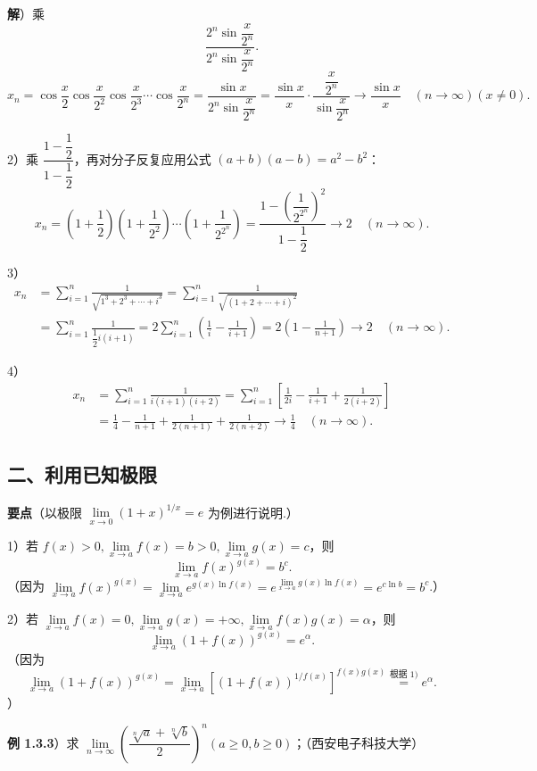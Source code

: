 \documentclass[UTF8, 12pt, fontset=fandol, oneside]{ctexart}
\begin{document}
\noindent\textbf{解}）乘
\[
  \frac{2^n\sin\dfrac{x}{2^n}}{2^n\sin\dfrac{x}{2^n}}.
\]
\[
x_n=\cos\frac{x}{2}\cos\frac{x}{2^2}\cos\frac{x}{2^3}\cdots\cos\frac{x}{2^n}
=\frac{\sin x}{2^n\sin\dfrac{x}{2^n}}
=\frac{\sin x}{x}\cdot\frac{\dfrac{x}{2^n}}{\sin\dfrac{x}{2^n}}
\to\frac{\sin x}{x}\quad(n\to\infty)(x\ne0).
\]

2）乘 $\dfrac{1-\dfrac12}{1-\dfrac12}$，再对分子反复应用公式 $(a+b)(a-b)=a^2-b^2$：
\[
x_n=\left(1+\frac12\right)\left(1+\frac1{2^2}\right)\cdots\left(1+\frac1{2^{2^n}}\right)
=\frac{1-\left(\dfrac1{2^{2^n}}\right)^2}{1-\dfrac12}\to2\quad(n\to\infty).
\]

3）
\[
\begin{aligned}
x_n
&=\sum_{i=1}^n\frac1{\sqrt{1^3+2^3+\cdots+i^3}}
=\sum_{i=1}^n\frac1{\sqrt{(1+2+\cdots+i)^2}}\\
&=\sum_{i=1}^n\frac1{\dfrac12 i(i+1)}
=2\sum_{i=1}^n\left(\frac1i-\frac1{i+1}\right)
=2\left(1-\frac1{n+1}\right)\to2\quad(n\to\infty).
\end{aligned}
\]

4）
\[
\begin{aligned}
x_n&=\sum_{i=1}^n\frac1{i(i+1)(i+2)}
=\sum_{i=1}^n\left[\frac1{2i}-\frac1{i+1}+\frac1{2(i+2)}\right]\\
&=\frac14-\frac1{n+1}+\frac1{2(n+1)}+\frac1{2(n+2)}
\to\frac14\quad(n\to\infty).
\end{aligned}
\]

\subsection*{二、利用已知极限}

\noindent\textbf{要点}\quad （以极限 $\lim\limits_{x\to0}(1+x)^{1/x}=e$ 为例进行说明.）

1）若 $f(x)>0,\lim\limits_{x\to a}f(x)=b>0,\lim\limits_{x\to a}g(x)=c$，则
\[
  \lim_{x\to a}f(x)^{g(x)}=b^c.
\]
（因为 $\lim\limits_{x\to a}f(x)^{g(x)}
=\lim\limits_{x\to a}e^{g(x)\ln f(x)}
=e^{\lim\limits_{x\to a}g(x)\ln f(x)}=e^{c\ln b}=b^c$.）

2）若 $\lim\limits_{x\to a}f(x)=0,\lim\limits_{x\to a}g(x)=+\infty,\lim\limits_{x\to a}f(x)g(x)=\alpha$，则
\[
  \lim_{x\to a}(1+f(x))^{g(x)}=e^\alpha.
\]
（因为
\[
\lim_{x\to a}(1+f(x))^{g(x)}
=\lim_{x\to a}\left[(1+f(x))^{1/f(x)}\right]^{f(x)g(x)}
\stackrel{\text{根据 1)}}{=}e^\alpha.
\]）

\noindent\textbf{例 1.3.3}）求 $\lim\limits_{n\to\infty}\left(\dfrac{\sqrt[n]{a}+\sqrt[n]{b}}2\right)^n(a\ge0,b\ge0)$；（西安电子科技大学）
\end{document}

